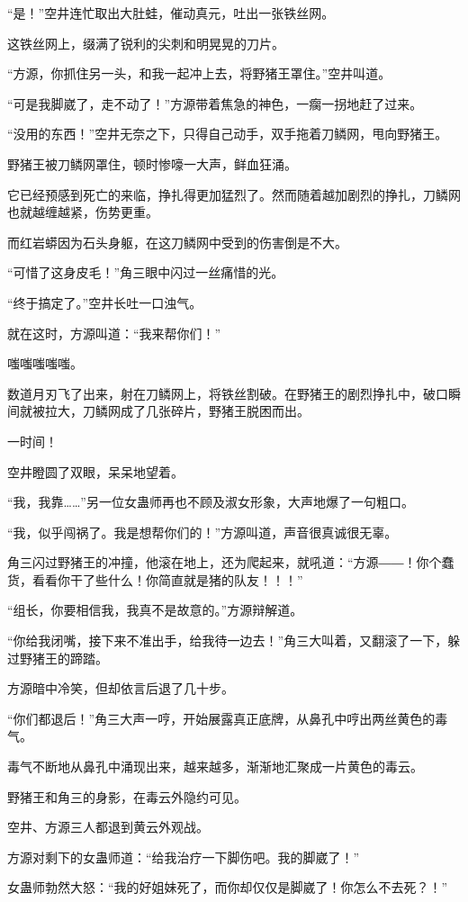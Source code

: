 \begin{this_body}
“是！”空井连忙取出大肚蛙，催动真元，吐出一张铁丝网。

这铁丝网上，缀满了锐利的尖刺和明晃晃的刀片。

“方源，你抓住另一头，和我一起冲上去，将野猪王罩住。”空井叫道。

“可是我脚崴了，走不动了！”方源带着焦急的神色，一瘸一拐地赶了过来。

“没用的东西！”空井无奈之下，只得自己动手，双手拖着刀鳞网，甩向野猪王。

野猪王被刀鳞网罩住，顿时惨嚎一大声，鲜血狂涌。

它已经预感到死亡的来临，挣扎得更加猛烈了。然而随着越加剧烈的挣扎，刀鳞网也就越缠越紧，伤势更重。

而红岩蟒因为石头身躯，在这刀鳞网中受到的伤害倒是不大。

“可惜了这身皮毛！”角三眼中闪过一丝痛惜的光。

“终于搞定了。”空井长吐一口浊气。

就在这时，方源叫道：“我来帮你们！”

嗤嗤嗤嗤嗤。

数道月刃飞了出来，射在刀鳞网上，将铁丝割破。在野猪王的剧烈挣扎中，破口瞬间就被拉大，刀鳞网成了几张碎片，野猪王脱困而出。

一时间！

空井瞪圆了双眼，呆呆地望着。

“我，我靠……”另一位女蛊师再也不顾及淑女形象，大声地爆了一句粗口。

“我，似乎闯祸了。我是想帮你们的！”方源叫道，声音很真诚很无辜。

角三闪过野猪王的冲撞，他滚在地上，还为爬起来，就吼道：“方源――！你个蠢货，看看你干了些什么！你简直就是猪的队友！！！”

“组长，你要相信我，我真不是故意的。”方源辩解道。

“你给我闭嘴，接下来不准出手，给我待一边去！”角三大叫着，又翻滚了一下，躲过野猪王的蹄踏。

方源暗中冷笑，但却依言后退了几十步。

“你们都退后！”角三大声一哼，开始展露真正底牌，从鼻孔中哼出两丝黄色的毒气。

毒气不断地从鼻孔中涌现出来，越来越多，渐渐地汇聚成一片黄色的毒云。

野猪王和角三的身影，在毒云外隐约可见。

空井、方源三人都退到黄云外观战。

方源对剩下的女蛊师道：“给我治疗一下脚伤吧。我的脚崴了！”

女蛊师勃然大怒：“我的好姐妹死了，而你却仅仅是脚崴了！你怎么不去死？！”


\end{this_body}
